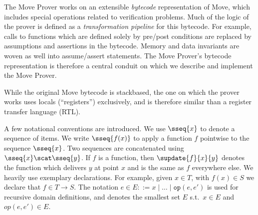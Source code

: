 

The Move Prover works on an extensible \emph{bytecode} representation of Move,
which includes special operations related to verification problems. Much of the
logic of the prover is defined as a \emph{transformation pipeline} for this
bytecode. For example, calls to functions which are defined solely by pre/post
conditions are replaced by assumptions and assertions in the bytecode.  Memory
and data invariants are woven as well into assume/assert statements.  The Move
Prover's bytecode representation is therefore a central conduit on which we
describe and implement the Move Prover.

While the original Move bytecode is stackbased, the one on which the prover works
uses locals (``registers'') exclusively, and is therefore similar than a register
transfer language (RTL).





A few notational conventions are introduced. We use $\sseq{x}$ to denote a
sequence of items. We write $\sseq{f(x)}$ to apply a function $f$ pointwise to
the sequence $\sseq{x}$. Two sequences are concatenated using
$\sseq{x} \scat \sseq{y}$. If $f$ is a function, then $\supdate{f}{x}{y}$
denotes the function which delivers $y$ at point $x$ and is the same as $f$
everywhere else. We heavily use exemplary declarations. For example, given
$x \in T$, with $f(x) \in S$ we declare that $f \in T \rightarrow S$. The
notation $e \in E ::= x \mid \ldots \mid \mathtt{op}(e, e')$ is used for
recursive domain definitions, and denotes the smallest set $E$ s.t.~$x \in E$
and $op(e, e') \in E$.





